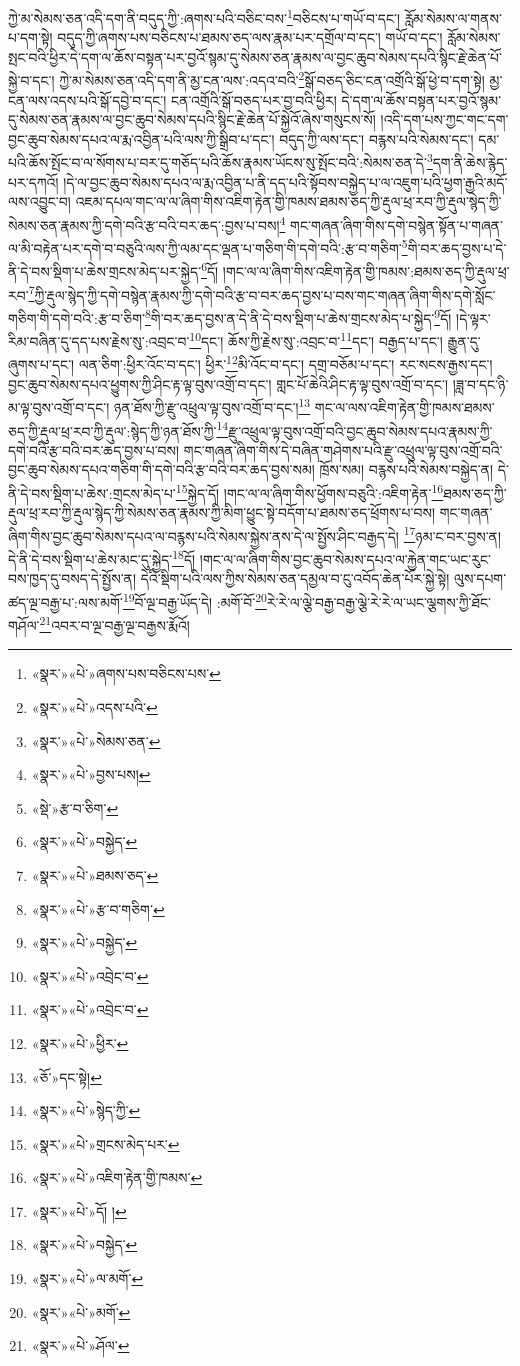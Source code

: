 ཀྱེ་མ་སེམས་ཅན་འདི་དག་ནི་བདུད་ཀྱི་:ཞགས་པའི་བཅིང་བས་\footnote{«སྣར་»«པེ་»ཞགས་པས་བཅིངས་པས་}བཅིངས་པ་གཡོ་བ་དང་། རློམ་སེམས་ལ་གནས་པ་དག་སྟེ། བདུད་ཀྱི་ཞགས་པས་བཅིངས་པ་ཐམས་ཅད་ལས་རྣམ་པར་དགྲོལ་བ་དང་། གཡོ་བ་དང་། རློམ་སེམས་སྤང་བའི་ཕྱིར་དེ་དག་ལ་ཆོས་བསྟན་པར་བྱའོ་སྙམ་དུ་སེམས་ཅན་རྣམས་ལ་བྱང་ཆུབ་སེམས་དཔའི་སྙིང་རྗེ་ཆེན་པོ་སྐྱེ་བ་དང་། ཀྱེ་མ་སེམས་ཅན་འདི་དག་ནི་མྱ་ངན་ལས་:འདའ་བའི་\footnote{«སྣར་»«པེ་»འདས་པའི་}སྒོ་བཅད་ཅིང་ངན་འགྲོའི་སྒོ་ཕྱེ་བ་དག་སྟེ། མྱ་ངན་ལས་འདས་པའི་སྒོ་དབྱེ་བ་དང་། ངན་འགྲོའི་སྒོ་བཅད་པར་བྱ་བའི་ཕྱིར། དེ་དག་ལ་ཆོས་བསྟན་པར་བྱའོ་སྙམ་དུ་སེམས་ཅན་རྣམས་ལ་བྱང་ཆུབ་སེམས་དཔའི་སྙིང་རྗེ་ཆེན་པོ་སྐྱེའོ་ཞེས་གསུངས་སོ། །འདི་དག་པས་ཀྱང་གང་དག་བྱང་ཆུབ་སེམས་དཔའ་ལ་རྨ་འབྱིན་པའི་ལས་ཀྱི་སྒྲིབ་པ་དང་། བདུད་ཀྱི་ལས་དང་། བརྙས་པའི་སེམས་དང་། དམ་པའི་ཆོས་སྤོང་བ་ལ་སོགས་པ་བར་དུ་གཅོད་པའི་ཆོས་རྣམས་ཡོངས་སུ་སྤོང་བའི་:སེམས་ཅན་དེ་\footnote{«སྣར་»«པེ་»སེམས་ཅན་}དག་ནི་ཆེས་རྙེད་པར་དཀའོ། །དེ་ལ་བྱང་ཆུབ་སེམས་དཔའ་ལ་རྨ་འབྱིན་པ་ནི་དད་པའི་སྟོབས་བསྐྱེད་པ་ལ་འཇུག་པའི་ཕྱག་རྒྱའི་མདོ་ལས་འབྱུང་བ། འཇམ་དཔལ་གང་ལ་ལ་ཞིག་གིས་འཇིག་རྟེན་གྱི་ཁམས་ཐམས་ཅད་ཀྱི་རྡུལ་ཕྲ་རབ་ཀྱི་རྡུལ་སྙེད་ཀྱི་སེམས་ཅན་རྣམས་ཀྱི་དགེ་བའི་རྩ་བའི་བར་ཆད་:བྱས་པ་བས།\footnote{«སྣར་»«པེ་»བྱས་པས།} གང་གཞན་ཞིག་གིས་དགེ་བསྙེན་སྟོན་པ་གཞན་ལ་མི་བརྟེན་པར་དགེ་བ་བཅུའི་ལས་ཀྱི་ལམ་དང་ལྡན་པ་གཅིག་གི་དགེ་བའི་:རྩ་བ་གཅིག་\footnote{«སྡེ་»རྩ་བ་ཅིག་}གི་བར་ཆད་བྱས་པ་དེ་ནི་དེ་བས་སྡིག་པ་ཆེས་གྲངས་མེད་པར་སྐྱེད་\footnote{«སྣར་»«པེ་»བསྐྱེད་}དོ། །གང་ལ་ལ་ཞིག་གིས་འཇིག་རྟེན་གྱི་ཁམས་:ཐམས་ཅད་ཀྱི་རྡུལ་ཕྲ་རབ་\footnote{«སྣར་»«པེ་»ཐམས་ཅད་}ཀྱི་རྡུལ་སྙེད་ཀྱི་དགེ་བསྙེན་རྣམས་ཀྱི་དགེ་བའི་རྩ་བ་བར་ཆད་བྱས་པ་བས་གང་གཞན་ཞིག་གིས་དགེ་སློང་གཅིག་གི་དགེ་བའི་:རྩ་བ་ཅིག་\footnote{«སྣར་»«པེ་»རྩ་བ་གཅིག་}གི་བར་ཆད་བྱས་ན་དེ་ནི་དེ་བས་སྡིག་པ་ཆེས་གྲངས་མེད་པ་སྐྱེད་\footnote{«སྣར་»«པེ་»བསྐྱེད་}དོ། །དེ་ལྟར་རིམ་བཞིན་དུ་དད་པས་རྗེས་སུ་:འབྲང་བ་\footnote{«སྣར་»«པེ་»འབྲེང་བ་}དང་། ཆོས་ཀྱི་རྗེས་སུ་:འབྲང་བ་\footnote{«སྣར་»«པེ་»འབྲེང་བ་}དང་། བརྒྱད་པ་དང་། རྒྱུན་དུ་ཞུགས་པ་དང་། ལན་ཅིག་:ཕྱིར་འོང་བ་དང་། ཕྱིར་\footnote{«སྣར་»«པེ་»ཕྱིར་}མི་འོང་བ་དང་། དགྲ་བཅོམ་པ་དང་། རང་སངས་རྒྱས་དང་། བྱང་ཆུབ་སེམས་དཔའ་ཕྱུགས་ཀྱི་ཤིང་རྟ་ལྟ་བུས་འགྲོ་བ་དང་། གླང་པོ་ཆེའི་ཤིང་རྟ་ལྟ་བུས་འགྲོ་བ་དང་། །ཟླ་བ་དང་ཉི་མ་ལྟ་བུས་འགྲོ་བ་དང་། ཉན་ཐོས་ཀྱི་རྫུ་འཕྲུལ་ལྟ་བུས་འགྲོ་བ་དང་།\footnote{«ཅོ་»དང་སྟེ།} གང་ལ་ལས་འཇིག་རྟེན་གྱི་ཁམས་ཐམས་ཅད་ཀྱི་རྡུལ་ཕྲ་རབ་ཀྱི་རྡུལ་:སྙེད་ཀྱི་ཉན་ཐོས་ཀྱི་\footnote{«སྣར་»«པེ་»སྙེད་ཀྱི་}རྫུ་འཕྲུལ་ལྟ་བུས་འགྲོ་བའི་བྱང་ཆུབ་སེམས་དཔའ་རྣམས་ཀྱི་དགེ་བའི་རྩ་བའི་བར་ཆད་བྱས་པ་བས། གང་གཞན་ཞིག་གིས་དེ་བཞིན་གཤེགས་པའི་རྫུ་འཕྲུལ་ལྟ་བུས་འགྲོ་བའི་བྱང་ཆུབ་སེམས་དཔའ་གཅིག་གི་དགེ་བའི་རྩ་བའི་བར་ཆད་བྱས་སམ། ཁྲོས་སམ། བརྙས་པའི་སེམས་བསྐྱེད་ན། དེ་ནི་དེ་བས་སྡིག་པ་ཆེས་:གྲངས་མེད་པ་\footnote{«སྣར་»«པེ་»གྲངས་མེད་པར་}སྐྱེད་དོ། །གང་ལ་ལ་ཞིག་གིས་ཕྱོགས་བཅུའི་:འཇིག་རྟེན་\footnote{«སྣར་»«པེ་»འཇིག་རྟེན་གྱི་ཁམས་}ཐམས་ཅད་ཀྱི་རྡུལ་ཕྲ་རབ་ཀྱི་རྡུལ་སྙེད་ཀྱི་སེམས་ཅན་རྣམས་ཀྱི་མིག་ཕྱུང་སྟེ་བདོག་པ་ཐམས་ཅད་ཕྲོགས་པ་བས། གང་གཞན་ཞིག་གིས་བྱང་ཆུབ་སེམས་དཔའ་ལ་བརྙས་པའི་སེམས་སྐྱེས་ནས་དེ་ལ་སྤྱོས་ཤིང་བརྒྱད་དེ། \footnote{«སྣར་»«པེ་»དོ། ། }ཉམ་ང་བར་བྱས་ན། དེ་ནི་དེ་བས་སྡིག་པ་ཆེས་མང་དུ་སྐྱེད་\footnote{«སྣར་»«པེ་»བསྐྱེད་}དོ། །གང་ལ་ལ་ཞིག་གིས་བྱང་ཆུབ་སེམས་དཔའ་ལ་རྐྱེན་གང་ཡང་རུང་བས་ཁྱད་དུ་བསད་དེ་སྤྱོས་ན། དེའི་སྡིག་པའི་ལས་ཀྱིས་སེམས་ཅན་དམྱལ་བ་ངུ་འབོད་ཆེན་པོར་སྐྱེ་སྟེ། ལུས་དཔག་ཚད་ལྔ་བརྒྱ་པ་:ལས་མགོ་\footnote{«སྣར་»«པེ་»ལ་མགོ་}བོ་ལྔ་བརྒྱ་ཡོད་དེ། :མགོ་བོ་\footnote{«སྣར་»«པེ་»མགོ་}རེ་རེ་ལ་ལྕེ་བརྒྱ་བརྒྱ་ལྕེ་རེ་རེ་ལ་ཡང་ལྕགས་ཀྱི་ཐོང་གཤོལ་\footnote{«སྣར་»«པེ་»ཤོལ་}འབར་བ་ལྔ་བརྒྱ་ལྔ་བརྒྱས་རྨོའོ། 